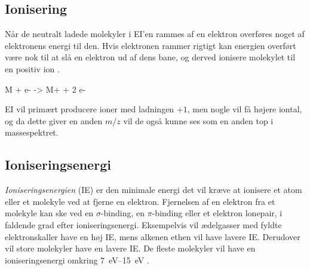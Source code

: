 \subsection{Ionisering}
Når de neutralt ladede molekyler i EI'en rammes af en elektron overføres noget af elektronens energi til den.
Hvis elektronen rammer rigtigt kan energien overført være nok til at slå en elektron ud af dens bane, og derved ionisere molekylet til en positiv ion \parencite{mstextbook}.
\begin{reaction}
	M + e- -> M+ + 2 e-
\end{reaction}
EI vil primært producere ioner med ladningen $+1$, men nogle vil få højere iontal, og da dette giver en anden $m/z$ vil de også kunne ses som en anden top i massespektret.
\subsection{Ioniseringsenergi}
\emph{Ioniseringsenergien} (IE) er den minimale energi det vil kræve at ionisere et atom eller et molekyle ved at fjerne en elektron.
Fjernelsen af en elektron fra et molekyle kan ske ved en $\sigma$-binding, en $\pi$-binding eller et elektron lonepair, i faldende grad efter ioniseringsenergi.
Eksempelvis vil ædelgasser med fyldte elektronskaller have en høj IE, mens alkenen ethen vil have lavere IE.
Derudover vil store molekyler have en lavere IE.
De fleste molekyler vil have en ioniseringsenergi omkring \qtyrange{7}{15}{\eV} \parencite{mstextbook}.
